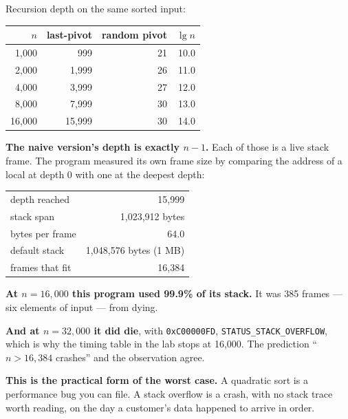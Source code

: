 \begin{worked}
Recursion depth on the same sorted input:

\begin{center}
\begin{tabular}{@{}rrrr@{}}
\toprule
\rowcolor{primary!15}
$n$ & last-pivot & random pivot & $\lg n$ \\
\midrule
 1{,}000 &    999 & 21 & 10.0 \\
 2{,}000 &  1{,}999 & 26 & 11.0 \\
 4{,}000 &  3{,}999 & 27 & 12.0 \\
 8{,}000 &  7{,}999 & 30 & 13.0 \\
16{,}000 & 15{,}999 & 30 & 14.0 \\
\bottomrule
\end{tabular}
\end{center}

\smallskip
\textbf{The naive version's depth is exactly $n-1$.} Each of those is a live
stack frame. The program measured its own frame size by comparing the address
of a local at depth 0 with one at the deepest depth:

\begin{center}
\begin{tabular}{@{}lr@{}}
depth reached       & 15{,}999 \\
stack span          & 1{,}023{,}912 bytes \\
bytes per frame     & 64.0 \\
default stack       & 1{,}048{,}576 bytes (1 MB) \\
frames that fit     & 16{,}384 \\
\end{tabular}
\end{center}

\smallskip
\textbf{At $n = 16{,}000$ this program used 99.9\% of its stack.} It was 385
frames --- six elements of input --- from dying.

\smallskip
\textbf{And at $n = 32{,}000$ it did die}, with \texttt{0xC00000FD},
\texttt{STATUS\_STACK\_OVERFLOW}, which is why the timing table in the lab
stops at 16{,}000. The prediction ``$n > 16{,}384$ crashes'' and the
observation agree.

\smallskip
\textbf{This is the practical form of the worst case.} A quadratic sort is a
performance bug you can file. A stack overflow is a crash, with no stack trace
worth reading, on the day a customer's data happened to arrive in order.
\end{worked}

